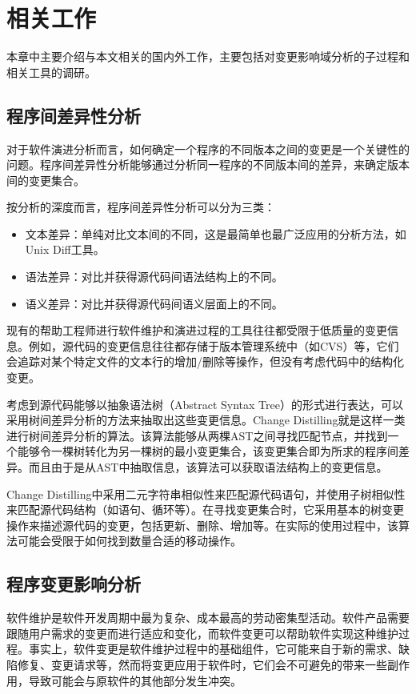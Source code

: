 \chapter{相关工作}

本章中主要介绍与本文相关的国内外工作，主要包括对变更影响域分析的子过程和相关工具的调研。
\section{程序间差异性分析}

对于软件演进分析而言，如何确定一个程序的不同版本之间的变更是一个关键性的问题\cite{kim2013identifying}。程序间差异性分析能够通过分析同一程序的不同版本间的差异，来确定版本间的变更集合\cite{lahiri2010differential,winstead2003towards}。

按分析的深度而言，程序间差异性分析可以分为三类：
\begin{itemize}
	\item 文本差异：单纯对比文本间的不同，这是最简单也最广泛应用的分析方法，如Unix Diff工具。
	\item 语法差异：对比并获得源代码间语法结构上的不同。
	\item 语义差异：对比并获得源代码间语义层面上的不同。
\end{itemize}

现有的帮助工程师进行软件维护和演进过程的工具往往都受限于低质量的变更信息。例如，源代码的变更信息往往都存储于版本管理系统中（如CVS）等，它们会追踪对某个特定文件的文本行的增加/删除等操作，但没有考虑代码中的结构化变更。

考虑到源代码能够以抽象语法树（Abstract Syntax Tree）的形式进行表达，可以采用树间差异分析的方法来抽取出这些变更信息。Change Distilling就是这样一类进行树间差异分析的算法\cite{fluri2007change,gall2009change}。该算法能够从两棵AST之间寻找匹配节点，并找到一个能够令一棵树转化为另一棵树的最小变更集合，该变更集合即为所求的程序间差异。而且由于是从AST中抽取信息，该算法可以获取语法结构上的变更信息。

Change Distilling中采用二元字符串相似性来匹配源代码语句，并使用子树相似性来匹配源代码结构（如语句、循环等）。在寻找变更集合时，它采用基本的树变更操作来描述源代码的变更，包括更新、删除、增加等。在实际的使用过程中，该算法可能会受限于如何找到数量合适的移动操作。

\section{程序变更影响分析}
软件维护是软件开发周期中最为复杂、成本最高的劳动密集型活动。软件产品需要跟随用户需求的变更而进行适应和变化，而软件变更可以帮助软件实现这种维护过程。事实上，软件变更是软件维护过程中的基础组件，它可能来自于新的需求、缺陷修复、变更请求等，然而将变更应用于软件时，它们会不可避免的带来一些副作用，导致可能会与原软件的其他部分发生冲突。

